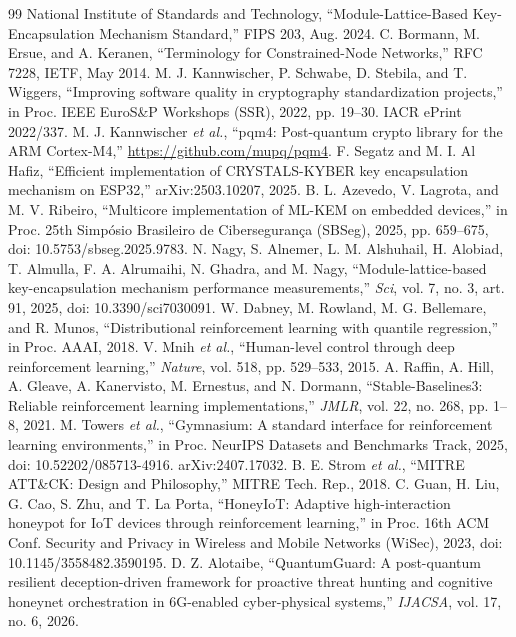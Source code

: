 \documentclass[conference]{IEEEtran}
\begin{document}
\begin{thebibliography}{99}
 National Institute of Standards and Technology,
``Module-Lattice-Based Key-Encapsulation Mechanism Standard,'' FIPS 203, Aug. 2024.
 C. Bormann, M. Ersue, and A. Keranen, ``Terminology for
Constrained-Node Networks,'' RFC 7228, IETF, May 2014.
 M. J. Kannwischer, P. Schwabe, D. Stebila, and T. Wiggers,
``Improving software quality in cryptography standardization projects,'' in
Proc. IEEE EuroS\&P Workshops (SSR), 2022, pp. 19--30. IACR ePrint 2022/337.
 M. J. Kannwischer \emph{et al.}, ``pqm4: Post-quantum crypto
library for the ARM Cortex-M4,'' \url{https://github.com/mupq/pqm4}.
 F. Segatz and M. I. Al Hafiz, ``Efficient implementation of
CRYSTALS-KYBER key encapsulation mechanism on ESP32,'' arXiv:2503.10207, 2025.
 B. L. Azevedo, V. Lagrota, and M. V. Ribeiro, ``Multicore
implementation of ML-KEM on embedded devices,'' in Proc. 25th Simp\'osio
Brasileiro de Ciberseguran\c{c}a (SBSeg), 2025, pp. 659--675,
doi: 10.5753/sbseg.2025.9783.
 N. Nagy, S. Alnemer, L. M. Alshuhail, H. Alobiad, T. Almulla,
F. A. Alrumaihi, N. Ghadra, and M. Nagy, ``Module-lattice-based key-encapsulation
mechanism performance measurements,'' \emph{Sci}, vol. 7, no. 3, art. 91, 2025,
doi: 10.3390/sci7030091.
 W. Dabney, M. Rowland, M. G. Bellemare, and R. Munos,
``Distributional reinforcement learning with quantile regression,'' in Proc.
AAAI, 2018.
 V. Mnih \emph{et al.}, ``Human-level control through deep
reinforcement learning,'' \emph{Nature}, vol. 518, pp. 529--533, 2015.
 A. Raffin, A. Hill, A. Gleave, A. Kanervisto, M. Ernestus, and
N. Dormann, ``Stable-Baselines3: Reliable reinforcement learning
implementations,'' \emph{JMLR}, vol. 22, no. 268, pp. 1--8, 2021.
 M. Towers \emph{et al.}, ``Gymnasium: A standard interface for
reinforcement learning environments,'' in Proc. NeurIPS Datasets and
Benchmarks Track, 2025, doi: 10.52202/085713-4916. arXiv:2407.17032.
 B. E. Strom \emph{et al.}, ``MITRE ATT\&CK: Design and
Philosophy,'' MITRE Tech. Rep., 2018.
 C. Guan, H. Liu, G. Cao, S. Zhu, and T. La Porta, ``HoneyIoT:
Adaptive high-interaction honeypot for IoT devices through reinforcement
learning,'' in Proc. 16th ACM Conf. Security and Privacy in Wireless and Mobile
Networks (WiSec), 2023, doi: 10.1145/3558482.3590195.
 D. Z. Alotaibe, ``QuantumGuard: A post-quantum
resilient deception-driven framework for proactive threat hunting and cognitive
honeynet orchestration in 6G-enabled cyber-physical systems,'' \emph{IJACSA},
vol. 17, no. 6, 2026.
\end{thebibliography}
\end{document}
